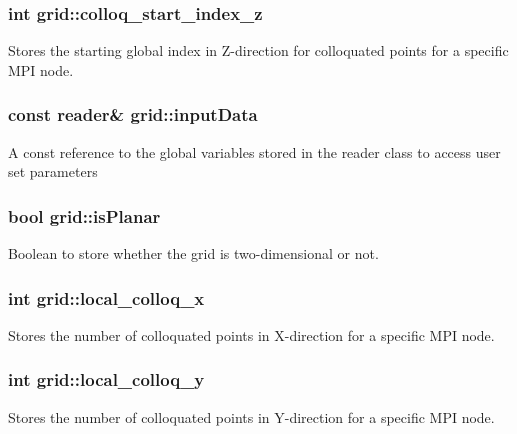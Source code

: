 \subsubsection[{\texorpdfstring{colloq\+\_\+start\+\_\+index\+\_\+z}{colloq_start_index_z}}]{\setlength{\rightskip}{0pt plus 5cm}int grid\+::colloq\+\_\+start\+\_\+index\+\_\+z}\hypertarget{classgrid_ab729ac896753c9ed4a750ec9af6ccfd3}{}\label{classgrid_ab729ac896753c9ed4a750ec9af6ccfd3}
Stores the starting global index in Z-\/direction for colloquated points for a specific M\+PI node. 
\subsubsection[{\texorpdfstring{input\+Data}{inputData}}]{\setlength{\rightskip}{0pt plus 5cm}const {\bf reader}\& grid\+::input\+Data}\hypertarget{classgrid_a0c044c1334ceb75cd73cfe1a1b5d471e}{}\label{classgrid_a0c044c1334ceb75cd73cfe1a1b5d471e}
A const reference to the global variables stored in the reader class to access user set parameters 
\subsubsection[{\texorpdfstring{is\+Planar}{isPlanar}}]{\setlength{\rightskip}{0pt plus 5cm}bool grid\+::is\+Planar}\hypertarget{classgrid_ad0060eb1dc9b2fef5e4642b5b0ef6d5e}{}\label{classgrid_ad0060eb1dc9b2fef5e4642b5b0ef6d5e}
Boolean to store whether the grid is two-\/dimensional or not. 
\subsubsection[{\texorpdfstring{local\+\_\+colloq\+\_\+x}{local_colloq_x}}]{\setlength{\rightskip}{0pt plus 5cm}int grid\+::local\+\_\+colloq\+\_\+x}\hypertarget{classgrid_a3f952029096b1590f4c1513405304153}{}\label{classgrid_a3f952029096b1590f4c1513405304153}
Stores the number of colloquated points in X-\/direction for a specific M\+PI node. 
\subsubsection[{\texorpdfstring{local\+\_\+colloq\+\_\+y}{local_colloq_y}}]{\setlength{\rightskip}{0pt plus 5cm}int grid\+::local\+\_\+colloq\+\_\+y}\hypertarget{classgrid_ab6ebb66bae61b6993443e5d0a3dd1f66}{}\label{classgrid_ab6ebb66bae61b6993443e5d0a3dd1f66}
Stores the number of colloquated points in Y-\/direction for a specific M\+PI node. 
